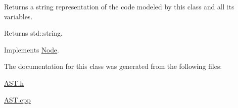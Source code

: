 Returns a string representation of the code modeled by this class and all its variables. 

\begin{DoxyReturn}{Returns}
std\-::string. 
\end{DoxyReturn}


Implements \hyperlink{classNode_a60ea533e0900961c05e701db70097136}{Node}.



The documentation for this class was generated from the following files\-:\begin{DoxyCompactItemize}
\item 
\hyperlink{AST_8h}{A\-S\-T.\-h}\item 
\hyperlink{AST_8cpp}{A\-S\-T.\-cpp}\end{DoxyCompactItemize}
